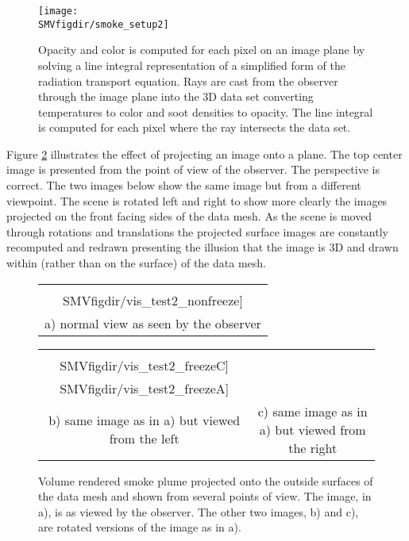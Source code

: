 {\begin{figure}[bph]
\begin{center}
\texttt{[image: \\SMVfigdir/smoke\_setup2]}
\end{center}
\caption[Opacity and color is computed for each pixel on an image
plane by solving a line integral representation of a simplified
form of the radiation transport equation.]{Opacity and color is
computed for each pixel on an image plane by solving a line
integral representation of a simplified form of the radiation
transport equation.  Rays are cast from the observer through the
image plane into the 3D data set converting temperatures to color
and soot densities to opacity.  The line integral is computed for
each pixel where the ray intersects the data set. }
\label{figsmokesetup2}
\end{figure}

Figure \ref{fig:volplume_example} illustrates the effect of
projecting an image onto a plane.  The top center image is
presented from the point of view of the observer.  The perspective
is correct.  The two images below show the same image but from a
different viewpoint.  The scene is rotated left and right to show
more clearly the images projected on the front facing sides of the
data mesh.  As the scene is moved through rotations and
translations the projected surface images are constantly
recomputed and redrawn presenting the illusion that the image is
3D and drawn within (rather than on the surface) of the data mesh.


\begin{figure}[bph]
\begin{center}
\begin{tabular}{c}
\texttt{[image: \\SMVfigdir/vis\_test2\_nonfreeze]}\\
a) normal view as seen by the observer
\end{tabular}
\begin{tabular}{cc}
\texttt{[image: \\SMVfigdir/vis\_test2\_freezeC]}&
\texttt{[image: \\SMVfigdir/vis\_test2\_freezeA]}\\
b) same image as in a) but viewed from the left&c) same image
as in a) but viewed from the right\\
\end{tabular}
\end{center}
\caption[Volume rendered smoke plume shown from several points of
view.]{Volume rendered smoke plume projected onto the outside
surfaces of the data mesh and shown  from several points of view.
The image, in a), is as viewed by the observer.  The other two
images, b) and c), are rotated versions of the image as in a). }
\label{fig:volplume_example}
\end{figure}

}

